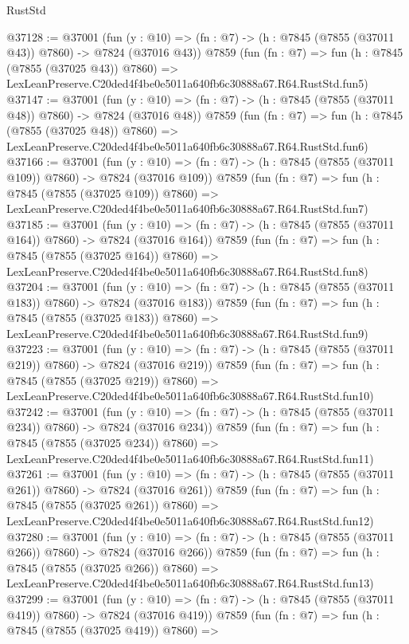 \begin{lexlean}{RustStd}
\begin{coremodule}
@37128 := @37001
    (fun (y : @10) => (fn : @7) -> (h : @7845 (@7855 (@37011 @43)) @7860) -> @7824 (@37016 @43))
    @7859
    (fun (fn : @7) =>
    fun (h : @7845 (@7855 (@37025 @43)) @7860) =>
    LexLeanPreserve.C20ded4f4be0e5011a640fb6c30888a67.R64.RustStd.fun5)
@37147 := @37001
    (fun (y : @10) => (fn : @7) -> (h : @7845 (@7855 (@37011 @48)) @7860) -> @7824 (@37016 @48))
    @7859
    (fun (fn : @7) =>
    fun (h : @7845 (@7855 (@37025 @48)) @7860) =>
    LexLeanPreserve.C20ded4f4be0e5011a640fb6c30888a67.R64.RustStd.fun6)
@37166 := @37001
    (fun (y : @10) => (fn : @7) -> (h : @7845 (@7855 (@37011 @109)) @7860) -> @7824 (@37016 @109))
    @7859
    (fun (fn : @7) =>
    fun (h : @7845 (@7855 (@37025 @109)) @7860) =>
    LexLeanPreserve.C20ded4f4be0e5011a640fb6c30888a67.R64.RustStd.fun7)
@37185 := @37001
    (fun (y : @10) => (fn : @7) -> (h : @7845 (@7855 (@37011 @164)) @7860) -> @7824 (@37016 @164))
    @7859
    (fun (fn : @7) =>
    fun (h : @7845 (@7855 (@37025 @164)) @7860) =>
    LexLeanPreserve.C20ded4f4be0e5011a640fb6c30888a67.R64.RustStd.fun8)
@37204 := @37001
    (fun (y : @10) => (fn : @7) -> (h : @7845 (@7855 (@37011 @183)) @7860) -> @7824 (@37016 @183))
    @7859
    (fun (fn : @7) =>
    fun (h : @7845 (@7855 (@37025 @183)) @7860) =>
    LexLeanPreserve.C20ded4f4be0e5011a640fb6c30888a67.R64.RustStd.fun9)
@37223 := @37001
    (fun (y : @10) => (fn : @7) -> (h : @7845 (@7855 (@37011 @219)) @7860) -> @7824 (@37016 @219))
    @7859
    (fun (fn : @7) =>
    fun (h : @7845 (@7855 (@37025 @219)) @7860) =>
    LexLeanPreserve.C20ded4f4be0e5011a640fb6c30888a67.R64.RustStd.fun10)
@37242 := @37001
    (fun (y : @10) => (fn : @7) -> (h : @7845 (@7855 (@37011 @234)) @7860) -> @7824 (@37016 @234))
    @7859
    (fun (fn : @7) =>
    fun (h : @7845 (@7855 (@37025 @234)) @7860) =>
    LexLeanPreserve.C20ded4f4be0e5011a640fb6c30888a67.R64.RustStd.fun11)
@37261 := @37001
    (fun (y : @10) => (fn : @7) -> (h : @7845 (@7855 (@37011 @261)) @7860) -> @7824 (@37016 @261))
    @7859
    (fun (fn : @7) =>
    fun (h : @7845 (@7855 (@37025 @261)) @7860) =>
    LexLeanPreserve.C20ded4f4be0e5011a640fb6c30888a67.R64.RustStd.fun12)
@37280 := @37001
    (fun (y : @10) => (fn : @7) -> (h : @7845 (@7855 (@37011 @266)) @7860) -> @7824 (@37016 @266))
    @7859
    (fun (fn : @7) =>
    fun (h : @7845 (@7855 (@37025 @266)) @7860) =>
    LexLeanPreserve.C20ded4f4be0e5011a640fb6c30888a67.R64.RustStd.fun13)
@37299 := @37001
    (fun (y : @10) => (fn : @7) -> (h : @7845 (@7855 (@37011 @419)) @7860) -> @7824 (@37016 @419))
    @7859
    (fun (fn : @7) =>
    fun (h : @7845 (@7855 (@37025 @419)) @7860) =>

\end{coremodule}
\end{lexlean}
